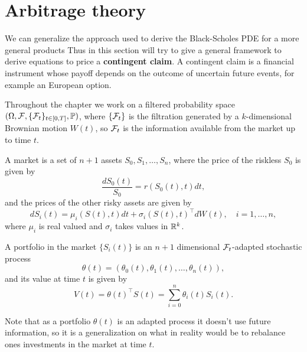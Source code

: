 \chapter{Arbitrage theory}\label{sec:arbitrage}

We can generalize the approach used to derive the Black-Scholes PDE for a more general products
Thus in this section will try to give a general framework to derive equations to price a \textbf{contingent claim}.
A contingent claim is a financial instrument whose payoff depends on the outcome of uncertain future events,
for example an European option.

Throughout the chapter we work on a filtered probability space $(\Omega, \mathcal{F}, \{ \mathcal{F}_t \}_{t \in [0, T]}, \mathbb{P})$,
where $\{ \mathcal{F}_t \}$ is the filtration generated by a $k$-dimensional Brownian motion $W(t)$,
so $\mathcal{F}_t$ is the information available from the market up to time $t$.

\begin{definition}[Market]\label{def:market}
    A market is a set of $n + 1$ assets $S_0, S_1, \dots, S_n$,
    where the price of the riskless $S_0$ is given by
    \begin{equation*}
        \frac{dS_0(t)}{S_0} = r(S_0(t), t) dt,
    \end{equation*}
    and the prices of the other risky assets are given by
    \begin{equation*}
        dS_i(t) = \mu_i(S(t), t) dt + \sigma_i(S(t), t)^\intercal dW(t),
        \quad i = 1, \dots, n,
    \end{equation*}
    where $\mu_i$ is real valued and $\sigma_i$ takes values in $\mathbb{R}^k$.
\end{definition}

\begin{definition}[Portfolio]\label{def:portoflio}
    A portfolio in the market $\{ S_i(t) \}$ is an $n + 1$ dimensional $\mathcal{F}_t$-adapted stochastic process
    \begin{equation*}
        \theta(t) = (\theta_0(t), \theta_1(t), \dots, \theta_n(t)),
    \end{equation*}
    and its value at time $t$ is given by
    \begin{equation*}
        V(t) = \theta(t)^\intercal S(t)
            = \sum_{i = 0}^n \theta_i(t) S_i(t).
    \end{equation*}
\end{definition}

Note that as a portfolio $\theta(t)$ is an adapted process it doesn't use future information,
so it is  a generalization on what in reality would be to rebalance ones investments in the market at time $t$.

